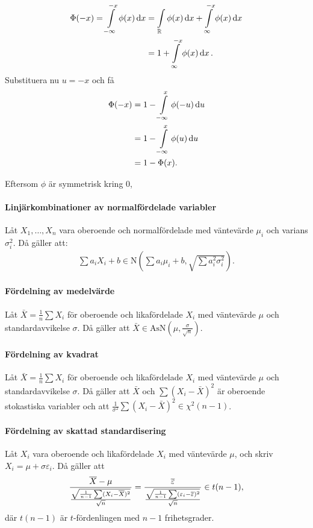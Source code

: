 \proof
\begin{align*}
	\Phi(-x) = \int\limits_{-\infty}^{-x}\phi(x)\dd{x} &= \int\limits_{\mathbb{R}}^{}\phi(x)\dd{x} + \int\limits_{\infty}^{-x}\phi(x)\dd{x} \\
	                                        &= 1 + \int\limits_{\infty}^{-x}\phi(x)\dd{x}.
\end{align*}
Substituera nu $u = -x$ och få
\begin{align*}
	\Phi(-x) &= 1 - \int\limits_{-\infty}^{x}\phi(-u)\dd{u} \\
	         &= 1 - \int\limits_{-\infty}^{x}\phi(u)\dd{u} \\
	         &= 1 - \Phi(x).
\end{align*}

Eftersom $\phi$ är symmetrisk kring $0$,

\paragraph{Linjärkombinationer av normalfördelade variabler}
Låt $X_1, \dots, X_n$ vara oberoende och normalfördelade med väntevärde $\mu_i$ och varians $\sigma_i^2$. Då gäller att:
\begin{align*}
	\sum a_iX_i + b\in\text{N}\left(\sum a_i\mu_i + b, \sqrt{\sum a_i^2\sigma_i^2}\right).
\end{align*}

\proof

\paragraph{Fördelning av medelvärde}
Låt $\bar{X} = \frac{1}{n}\sum X_i$ för oberoende och likafördelade $X_i$ med väntevärde $\mu$ och standardavvikelse $\sigma$. Då gäller att $\bar{X}\in\text{AsN}\left(\mu, \frac{\sigma}{\sqrt{n}}\right)$.

\paragraph{Fördelning av kvadrat}
Låt $\bar{X} = \frac{1}{n}\sum X_i$ för oberoende och likafördelade $X_i$ med väntevärde $\mu$ och standardavvikelse $\sigma$. Då gäller att $\bar{X}$ och $\sum(X_i - \bar{X})^2$ är oberoende stokastiska variabler och att $\frac{1}{\sigma^2}\sum(X_i - \bar{X})^2\in\chi^2(n - 1)$.

\paragraph{Fördelning av skattad standardisering}
Låt $X_i$ vara oberoende och likafördelade $X_i$ med väntevärde $\mu$, och skriv $X_i = \mu + \sigma\varepsilon_i$. Då gäller att
\begin{align*}
	\frac{\overline{X} - \mu}{\frac{\sqrt{\frac{1}{n - 1}\sum (X_i - \overline{X})^2}}{\sqrt{n}}} = \frac{\overline{\varepsilon}}{\frac{\sqrt{\frac{1}{n - 1}\sum (\varepsilon_i - \overline{\varepsilon})^2}}{\sqrt{n}}}\in t(n - 1),
\end{align*}
där $t(n - 1)$ är $t$-fördenlingen med $n - 1$ frihetsgrader.


